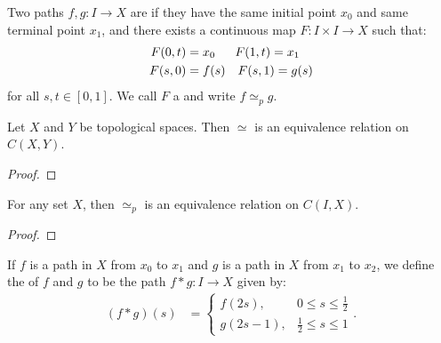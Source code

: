 \begin{definition}
    Two paths $f,g:I \rightarrow X$ are  if they have the same initial point $x_0$ and same terminal point $x_1$, and there exists a continuous map $F:I \times I \rightarrow X$ such that:
        \begin{equation*}
        \begin{split}
            F(0,t) &= x_0\h9\h7F(1,t) = x_1\\
            F(s,0) &= f(s)\h9\h1F(s,1) = g(s)\\
        \end{split}
        \end{equation*}
    for all $s,t \in [0,1]$. We call $F$ a  and write $f \simeq_p g$.
\end{definition}

\begin{lemma}
    Let $X$ and $Y$ be topological spaces. Then $\simeq$ is an equivalence relation on $C(X,Y)$.
\end{lemma}
    {\color{red} \begin{proof}
        
    \end{proof}}

\begin{corollary}
    For any set $X$, then $\simeq_p$ is an equivalence relation on $C(I,X)$.
\end{corollary}
    {\color{red} \begin{proof}

    \end{proof}}

\begin{definition}
    If $f$ is a path in $X$ from $x_0$ to $x_1$ and $g$ is a path in $X$ from $x_1$ to $x_2$, we define the  of $f$ and $g$ to be the path $f \ast g :I \rightarrow X$ given by:
        \begin{equation*}
        \begin{split}
            (f \ast g)(s) 
            & = \begin{cases}
            f(2s), & 0 \leq s \leq \frac12 \\
            g(2s - 1), & \frac12 \leq s \leq 1
            \end{cases}.
        \end{split}
        \end{equation*}
\end{definition}

